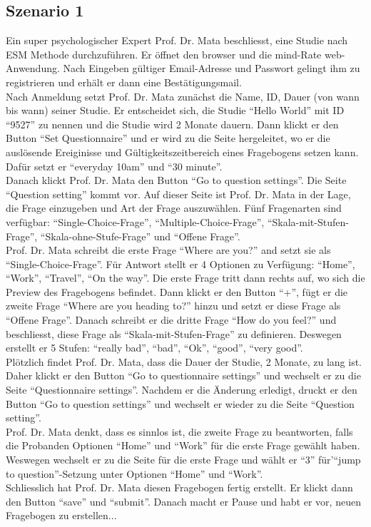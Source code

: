 \documentclass[a4paper]{scrreprt}
\begin{document}
            \subsection{Szenario 1}
                Ein super psychologischer Expert Prof. Dr. Mata beschliesst, eine Studie nach ESM Methode durchzuf\"uhren. Er \"offnet den browser und die mind-Rate web-Anwendung. Nach Eingeben g\"ultiger Email-Adresse und Passwort gelingt ihm zu registrieren und erh\"alt er dann eine Bestätigungsmail. \\
                Nach Anmeldung setzt Prof. Dr. Mata zun\"achst die Name, ID, Dauer (von wann bis wann) seiner Studie. Er entscheidet sich, die Studie ``Hello World'' mit ID ``9527'' zu nennen und die Studie wird 2 Monate dauern. Dann klickt er den Button ``Set Questionnaire'' und er wird zu die Seite hergeleitet, wo er die auslösende Ereiginisse und G\"ultigkeitszeitbereich eines Fragebogens setzen kann. Daf\"ur setzt er ``everyday 10am'' und ``30 minute''. \\
                Danach klickt Prof. Dr. Mata den Button ``Go to question settings''. Die Seite ``Question setting'' kommt vor. Auf dieser Seite ist Prof. Dr. Mata in der Lage, die Frage einzugeben und Art der Frage auszuw\"ahlen. F\"unf Fragenarten sind verf\"ugbar: ``Single-Choice-Frage'', ``Multiple-Choice-Frage'', ``Skala-mit-Stufen-Frage'', ``Skala-ohne-Stufe-Frage'' und ``Offene Frage''. \\
                Prof. Dr. Mata schreibt die erste Frage ``Where are you?'' and setzt sie als ``Single-Choice-Frage''. Für Antwort stellt er 4 Optionen zu Verf\"ugung: ``Home'', ``Work'', ``Travel'', ``On the way''. Die erste Frage tritt dann rechts auf, wo sich die Preview des Fragebogens befindet. Dann klickt er den Button ``+'', f\"ugt er die zweite Frage ``Where are you heading to?'' hinzu und setzt er diese Frage als ``Offene Frage''. Danach schreibt er die dritte Frage ``How do you feel?'' und beschliesst, diese Frage als ``Skala-mit-Stufen-Frage'' zu definieren. Deswegen erstellt er 5 Stufen: ``really bad'', ``bad'', ``Ok'', ``good'', ``very good''. \\
                Pl\"otzlich findet Prof. Dr. Mata, dass die Dauer der Studie, 2 Monate,  zu lang ist. Daher klickt er den Button ``Go to questionnaire settings'' und wechselt er zu die Seite ``Questionnaire settings''. Nachdem er die \"Anderung erledigt, druckt er den Button ``Go to question settings'' und wechselt er wieder zu die Seite ``Question setting''. \\
                Prof. Dr. Mata denkt, dass es sinnlos ist, die zweite Frage zu beantworten, falls die Probanden Optionen ``Home'' und ``Work'' f\"ur die erste Frage gew\"ahlt haben. Weswegen wechselt er zu die Seite f\"ur die erste Frage und w\"ahlt er ``3'' f\"ur'``jump to question''-Setzung unter Optionen ``Home'' und ``Work''. \\
                Schliesslich hat Prof. Dr. Mata diesen Fragebogen fertig erstellt. Er klickt dann den Button ``save'' und ``submit''. Danach macht er Pause und habt er vor, neuen Fragebogen zu erstellen...\\
\end{document}
